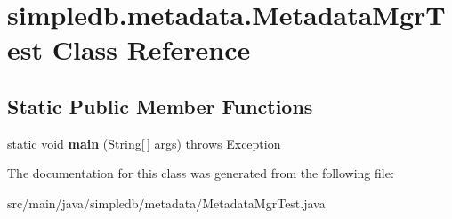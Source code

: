 \hypertarget{classsimpledb_1_1metadata_1_1MetadataMgrTest}{}\section{simpledb.\+metadata.\+Metadata\+Mgr\+Test Class Reference}
\label{classsimpledb_1_1metadata_1_1MetadataMgrTest}
\subsection*{Static Public Member Functions}
\begin{DoxyCompactItemize}
\item 
\mbox{\label{classsimpledb_1_1metadata_1_1MetadataMgrTest_a96a03d66e42a510fe3af370e97456816}} 
static void {\bfseries main} (String\mbox{[}$\,$\mbox{]} args)  throws Exception 
\end{DoxyCompactItemize}


The documentation for this class was generated from the following file\+:\begin{DoxyCompactItemize}
\item 
src/main/java/simpledb/metadata/Metadata\+Mgr\+Test.\+java\end{DoxyCompactItemize}

